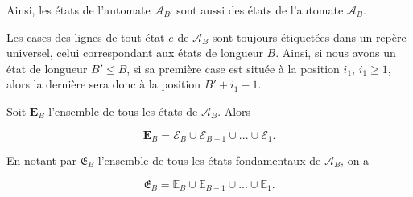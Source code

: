  Ainsi, les états de l'automate $\mathcal{A}_{B'}$  sont aussi des états  de l'automate $\mathcal{A}_{B}$.
\begin{Rem}\label{remd2}
Les cases des lignes de tout état $e$ de $\mathcal{A}_{B}$ sont toujours étiquetées dans un repère universel, celui correspondant aux états de longueur $B$. Ainsi, si nous avons un état de longueur $B'\leq B$, si sa première case est située à la position $i_{1}$, $i_{1}\geq 1$, alors la dernière sera donc à la position $B'+i_{1}-1$.
\end{Rem}
\begin{Def}\label{defAt7}
Soit $\mathbf{E}_{B}$ l'ensemble de tous les états  de $\mathcal{A}_{B}$.
Alors 

$$\mathbf{E}_{B}= \mathcal{E}_{B}\cup \mathcal{E}_{B-1}\cup...\cup \mathcal{E}_{1}.$$

En notant par $\mathfrak{E}_{B}$ l'ensemble de tous les états fondamentaux de $\mathcal{A}_{B}$, on a

$$\mathfrak{E}_{B}=\mathbb{E}_{B}\cup\mathbb{E}_{B-1}\cup ... \cup \mathbb{E}_{1}. $$
\end{Def}

